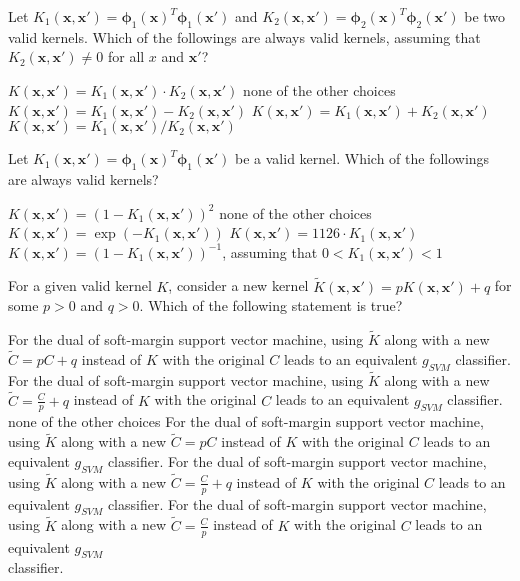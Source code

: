 \documentclass[a4paper,10pt]{exam}
\begin{document}
\begin{questions}
   \question Let $K_1(\mathbf{x}, \mathbf{x}') = {\boldsymbol\phi}_1(\mathbf{x}) ^T {\boldsymbol\phi}_1(\mathbf{x}')$ and $K_2(\mathbf{x}, \mathbf{x}') = {\boldsymbol\phi}_2(\mathbf{x}) ^T {\boldsymbol\phi}_2(\mathbf{x}')$ be two valid kernels. Which of the followings are always valid kernels, assuming that $K_2(\mathbf{x}, \mathbf{x}') \neq 0$ for all $x$ and $\mathbf{x}'$?
   \begin{checkboxes}
   	 \CorrectChoice $K(\mathbf{x}, \mathbf{x}') = K_1(\mathbf{x}, \mathbf{x}') \cdot K_2(\mathbf{x}, \mathbf{x}')$
   	 \choice none of the other choices
   	 \choice $K(\mathbf{x}, \mathbf{x}') = K_1(\mathbf{x}, \mathbf{x}') - K_2(\mathbf{x}, \mathbf{x}')$
   	 \CorrectChoice $K(\mathbf{x}, \mathbf{x}') = K_1(\mathbf{x}, \mathbf{x}') + K_2(\mathbf{x}, \mathbf{x}')$
   	 \choice $K(\mathbf{x}, \mathbf{x}') = K_1(\mathbf{x}, \mathbf{x}') / K_2(\mathbf{x}, \mathbf{x}')$
   \end{checkboxes}
   
   \question Let $K_1(\mathbf{x}, \mathbf{x}') = {\boldsymbol\phi}_1(\mathbf{x}) ^T {\boldsymbol\phi}_1(\mathbf{x}')$ be a valid kernel. Which of the followings are always valid kernels?
   \begin{checkboxes}
   	 \choice $K(\mathbf{x}, \mathbf{x}') = (1 - K_1(\mathbf{x}, \mathbf{x}'))^{2}$
   	 \choice none of the other choices
   	 \choice $K(\mathbf{x}, \mathbf{x}') = \exp(-K_1(\mathbf{x}, \mathbf{x}'))$
   	 \CorrectChoice $K(\mathbf{x}, \mathbf{x}') = 1126 \cdot K_1(\mathbf{x}, \mathbf{x}')$
   	 \CorrectChoice $K(\mathbf{x}, \mathbf{x}') = (1 - K_1(\mathbf{x}, \mathbf{x}'))^{-1}$, assuming that $0 < K_1(\mathbf{x}, \mathbf{x}') < 1$
   \end{checkboxes}
   
   \question For a given valid kernel $K$, consider a new kernel $\tilde{K}(\mathbf{x}, \mathbf{x}') = p K(\mathbf{x}, \mathbf{x}') + q$ for some $p>0$ and $q>0$. Which of the following statement is true?
  \begin{checkboxes}
  	\choice For the dual of soft-margin support vector machine, using $\tilde{K}$ along with a new $\tilde{C} = pC + q$ instead of $K$ with the original $C$ leads to an equivalent $g_{SVM}$ classifier.
  	\choice For the dual of soft-margin support vector machine, using $\tilde{K}$ along with a new $\tilde{C} = \frac{C}{p} + q$ instead of $K$ with the original $C$ leads to an equivalent $g_{SVM}$ classifier.
  	\choice none of the other choices
    \choice For the dual of soft-margin support vector machine, using $\tilde{K}$ along with a new $\tilde{C} = pC$ instead of $K$ with the original $C$ leads to an equivalent $g_{SVM}$ classifier.
   	\choice For the dual of soft-margin support vector machine, using $\tilde{K}$ along with a new $\tilde{C} = \frac{C}{p} + q$ instead of $K$ with the original $C$ leads to an equivalent $g_{SVM}$ classifier.
  	\CorrectChoice For the dual of soft-margin support vector machine, using $\tilde{K}$ along with a new $\tilde{C} = \frac{C}{p}$ instead of $K$ with the original $C$ leads to an equivalent $g_{SVM}$\\ classifier.
  \end{checkboxes}
  

\end{questions}
\end{document}

